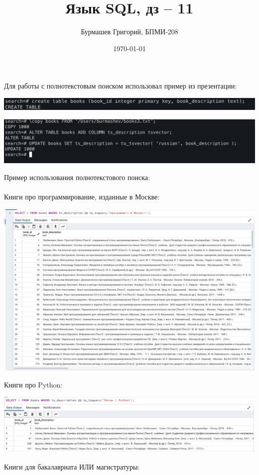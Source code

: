 \documentclass[a4paper,12pt]{article}
\author{Бурмашев Григорий, БПМИ-208}
\title{Язык SQL, дз -- 11}
\date{\today}
\begin{document}
\maketitle
\clearpage
Для работы с полнотекстовым поиском использовал пример из презентации:
\begin{center}
\includegraphics[scale=0.4]{1.png}
\end{center}
\begin{center}
\includegraphics[scale=0.4]{2.png}
\end{center}
Пример использования полнотекстового поиска:
\\\\
Книги про программирование, изданные в Москве:
\begin{center}
\includegraphics[scale=0.4]{3.png}
\end{center}
\clearpage
Книги про Python:
\begin{center}
\includegraphics[scale=0.4]{4.png}
\end{center}
Книги для бакалавриата ИЛИ магистратуры:
\end{document}
